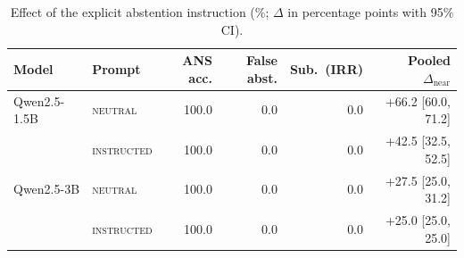 \begin{table}[t]
\centering
\small
\begin{tabular}{llrrrr}
\toprule
Model & Prompt & ANS acc. & False abst. & Sub.\ (IRR) & Pooled $\Delta_{\text{near}}$ \\
\midrule
Qwen2.5-1.5B & \textsc{neutral} & 100.0 & 0.0 & 0.0 & +66.2 [60.0, 71.2] \\
 & \textsc{instructed} & 100.0 & 0.0 & 0.0 & +42.5 [32.5, 52.5] \\
Qwen2.5-3B & \textsc{neutral} & 100.0 & 0.0 & 0.0 & +27.5 [25.0, 31.2] \\
 & \textsc{instructed} & 100.0 & 0.0 & 0.0 & +25.0 [25.0, 25.0] \\
\bottomrule
\end{tabular}
\caption{Effect of the explicit abstention instruction (\%; $\Delta$ in percentage points with 95\% CI).}
\label{tab:ablation}
\end{table}
